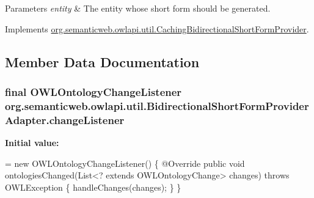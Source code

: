 \begin{DoxyParams}{Parameters}
{\em entity} & The entity whose short form should be generated. \\
\hline
\end{DoxyParams}


Implements \hyperlink{classorg_1_1semanticweb_1_1owlapi_1_1util_1_1_caching_bidirectional_short_form_provider_a9bdb7794f63a55fb88f752cacb362df4}{org.\-semanticweb.\-owlapi.\-util.\-Caching\-Bidirectional\-Short\-Form\-Provider}.



\subsection{Member Data Documentation}
\hypertarget{classorg_1_1semanticweb_1_1owlapi_1_1util_1_1_bidirectional_short_form_provider_adapter_a333dacfba3a2c030b4c9c5f17f0400e0}{
\subsubsection[{change\-Listener}]{\setlength{\rightskip}{0pt plus 5cm}final {\bf O\-W\-L\-Ontology\-Change\-Listener} org.\-semanticweb.\-owlapi.\-util.\-Bidirectional\-Short\-Form\-Provider\-Adapter.\-change\-Listener\hspace{0.3cm}{\ttfamily [private]}}}\label{classorg_1_1semanticweb_1_1owlapi_1_1util_1_1_bidirectional_short_form_provider_adapter_a333dacfba3a2c030b4c9c5f17f0400e0}
{\bfseries Initial value\-:}
\begin{DoxyCode}
= \textcolor{keyword}{new} OWLOntologyChangeListener() \{
        @Override
        \textcolor{keyword}{public} \textcolor{keywordtype}{void} ontologiesChanged(List<? extends OWLOntologyChange> changes)
                \textcolor{keywordflow}{throws} OWLException \{
            handleChanges(changes);
        \}
    \}
\end{DoxyCode}
